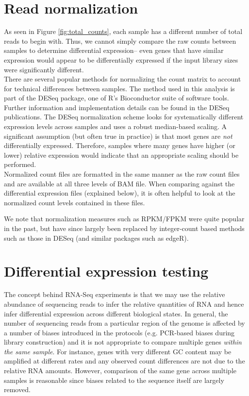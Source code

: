 \documentclass{article}
\begin{document}
{{\section{Read normalization}
\label{sec:normalization}

As seen in Figure \ref{fig:total_counts}, each sample has a different number of total reads to begin with.  Thus, we cannot simply compare the raw counts between samples to determine differential expression-- even genes that have similar expression would appear to be differentially expressed if the input library sizes were significantly different.\\

There are several popular methods for normalizing the count matrix to account for technical differences between samples.  The method used in this analysis is part of the DESeq \cite{deseq} package, one of R's Bioconductor suite of software tools.  Further information and implementation details can be found in the DESeq publications.  The DESeq normalization scheme looks for systematically different expression levels across samples and uses a robust median-based scaling.  A significant assumption (but often true in practice) is that most genes are \emph{not} differentially expressed.  Therefore, samples where many genes have higher (or lower) relative expression would indicate that an appropriate scaling should be performed.   \\

Normalized count files are formatted in the same manner as the raw count files and are available at all three levels of BAM file.  When comparing against the differential expression files (explained below), it is often helpful to look at the normalized count levels contained in these files.

We note that normalization measures such as RPKM/FPKM were quite popular in the past, but have since largely been replaced by integer-count based methods such as those in DESeq (and similar packages such as edgeR).


{%

\section{Differential expression testing}

The concept behind RNA-Seq experiments is that we may use the relative abundance of sequencing reads to infer the relative quantities of RNA and hence infer differential expression across different biological states.  In general, the number of sequencing reads from a particular region of the genome is affected by a number of biases introduced in the protocols (e.g. PCR-based biases during library construction) and it is not appropriate to compare multiple genes \emph{within the same sample}.  For instance, genes with very different GC content may be amplified at different rates and any observed count differences are not due to the relative RNA amounts.  However, comparison of the same gene across multiple samples is reasonable since biases related to the sequence itself are largely removed.\\

}}}
\end{document}
